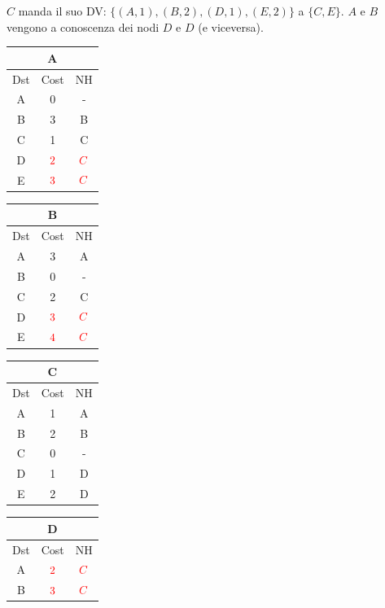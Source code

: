 \documentclass[10pt]{article}
\begin{document}
	\newline \newline
	$C$ manda il suo DV: $\{(A,1),(B,2),(D,1),(E,2)\}$ a $\{C,E\}$.
	\newline
	$A$ e $B$ vengono a conoscenza dei nodi $D$ e $D$ (e viceversa).
	\begin{table}[h!]
		\begin{tabular}{|c||c||c|}
 			\hline
	 		\multicolumn{3}{|c|}{A} \\
 			\hline
 			Dst & Cost & NH\\
 			\hline
 			A & 0 & - \\
 			B & 3 & B \\
 			C & 1 & C \\
 			D & $\color{red} 2$ & $\color{red} C$ \\
 			E & $\color{red} 3$ & $\color{red} C$ \\
 			\hline
		\end{tabular}
		\begin{tabular}{|c||c||c|}
 			\hline
	 		\multicolumn{3}{|c|}{B} \\
 			\hline
 			Dst & Cost & NH\\
 			\hline
 			A & 3 & A \\
 			B & 0 & - \\
 			C & 2 & C  \\
 			D & $\color{red} 3$ & $\color{red} C$ \\
 			E & $\color{red} 4$ & $\color{red} C$ \\
 			\hline
		\end{tabular}
		\begin{tabular}{|c||c||c|}
 			\hline
	 		\multicolumn{3}{|c|}{C} \\
 			\hline
 			Dst & Cost & NH\\
 			\hline
 			A & 1 & A \\
 			B & 2 & B \\
 			C & 0 & - \\
 			D & 1 & D \\
 			E & 2 & D \\
 			\hline
		\end{tabular}
		\begin{tabular}{|c||c||c|}
 			\hline
	 		\multicolumn{3}{|c|}{D} \\
 			\hline
 			Dst & Cost & NH\\
 			\hline
 			A & $\color{red} 2$ & $\color{red} C$ \\
 			B & $\color{red} 3$ & $\color{red} C$ \\

\end{tabular}
\end{table}
\end{document}
